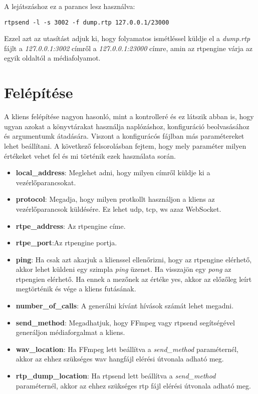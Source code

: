 A lejátszáshoz ez a parancs lesz használva: 

\begin{lstlisting}
rtpsend -l -s 3002 -f dump.rtp 127.0.0.1/23000
\end{lstlisting}

Ezzel azt az utasítást adjuk ki, hogy folyamatos ismétléssel küldje el a 
\textit{dump.rtp} fájlt a \textit{127.0.0.1:3002} címről a \textit{127.0.0.1:23000}
címre, amin az rtpengine várja az egyik oldaltól a médiafolyamot.

\section{Felépítése}

A kliens felépítése nagyon hasonló, mint a kontrolleré és ez látszik abban is, hogy
ugyan azokat a könyvtárakat használja naplózáshoz, konfiguráció beolvasásához és
argumentumk átadására. Viszont a konfigurácós fájlban más paramétereket lehet 
beállítani. A következő felsorolásban fejtem, hogy mely paraméter milyen értékeket 
vehet fel és mi történik ezek használata során. 

\begin{itemize}
	\item \textbf{local\_address}: Meglehet adni, hogy milyen címről küldje
	ki a vezérlőparancsokat.
	\item \textbf{protocol}: Megadja, hogy milyen protkollt használjon a kliens az
	vezérlőparancsok küldésére. Ez lehet udp, tcp, ws azaz WebSocket.
	\item \textbf{rtpe\_address}: Az rtpengine címe. 
	\item \textbf{rtpe\_port}:Az rtpengine portja.
	\item \textbf{ping}: Ha csak azt akarjuk a klienssel ellenőrizni, hogy az rtpengine
	elérhető, akkor lehet küldeni egy szimpla \textit{ping} üzenet. Ha visszajön egy
	\textit{pong} az rtpengien elérhető. Ha ennek a mezőnek az értéke yes, akkor 
	az előzőleg leírt megtörténik és vége a kliens futásának. 
	\item \textbf{number\_of\_calls}: A generálni kívánt hívások számát lehet megadni. 
	\item \textbf{send\_method}: Megadhatjuk, hogy FFmpeg vagy rtpsend segítségével
	generáljon médiaforgalmat a kliens.
	\item \textbf{wav\_location}: Ha FFmpeg lett beállítva a \textit{send\_method} 
	paraméternél, akkor az ehhez szükséges wav hangfájl elérési útvonala adható meg.
	\item \textbf{rtp\_dump\_location}: Ha rtpsend lett beállítva a 
	\textit{send\_method} paraméternél, akkor az ehhez szükséges rtp fájl elérési 
	útvonala adható meg.
\end{itemize}

